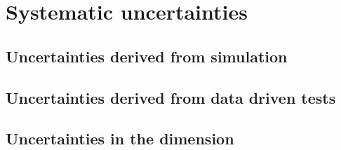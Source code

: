 \section{Systematic uncertainties}

\subsection{Uncertainties derived from simulation}

\subsection{Uncertainties derived from data driven tests}

\subsection{Uncertainties in the \MHT dimension}

